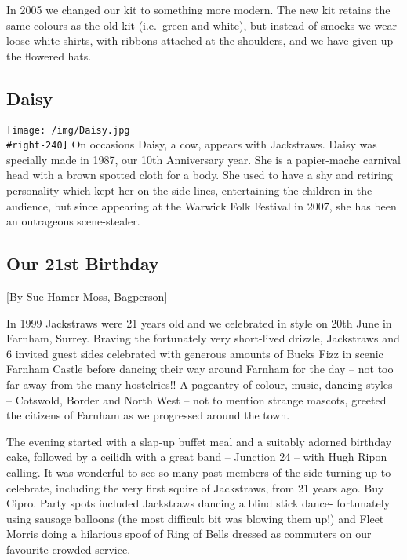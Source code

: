 \documentclass[
]{article}
\begin{document}
In 2005 we changed our kit to something more modern. The new kit retains
the same colours as the old kit (i.e.~green and white), but instead of
smocks we wear loose white shirts, with ribbons attached at the
shoulders, and we have given up the flowered hats.

\hypertarget{daisy}{%
\subsection{Daisy}\label{daisy}}

\texttt{[image: /img/Daisy.jpg\\\#right-240]} On occasions Daisy, a cow,
appears with Jackstraws. Daisy was specially made in 1987, our 10th
Anniversary year. She is a papier-mache carnival head with a brown
spotted cloth for a body. She used to have a shy and retiring
personality which kept her on the side-lines, entertaining the children
in the audience, but since appearing at the Warwick Folk Festival in
2007, she has been an outrageous scene-stealer.

\hypertarget{our-21st-birthday}{%
\subsection{Our 21st Birthday}\label{our-21st-birthday}}

{[}By Sue Hamer-Moss, Bagperson{]}

In 1999 Jackstraws were 21 years old and we celebrated in style on 20th
June in Farnham, Surrey. Braving the fortunately very short-lived
drizzle, Jackstraws and 6 invited guest sides celebrated with generous
amounts of Bucks Fizz in scenic Farnham Castle before dancing their way
around Farnham for the day -- not too far away from the many
hostelries!! A pageantry of colour, music, dancing styles -- Cotswold,
Border and North West -- not to mention strange mascots, greeted the
citizens of Farnham as we progressed around the town.

The evening started with a slap-up buffet meal and a suitably adorned
birthday cake, followed by a ceilidh with a great band -- Junction 24 --
with Hugh Ripon calling. It was wonderful to see so many past members of
the side turning up to celebrate, including the very first squire of
Jackstraws, from 21 years ago. Buy Cipro. Party spots included
Jackstraws dancing a blind stick dance- fortunately using sausage
balloons (the most difficult bit was blowing them up!) and Fleet Morris
doing a hilarious spoof of Ring of Bells dressed as commuters on our
favourite crowded service.
\end{document}
